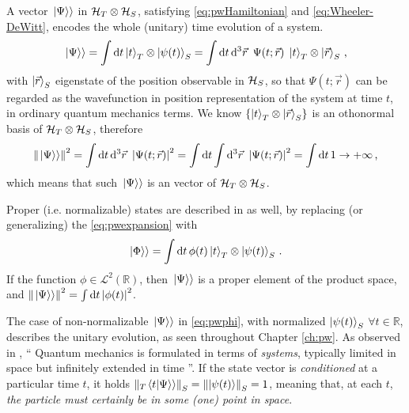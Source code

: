 A vector $\left.\left| \Psi \right\rangle\right\rangle$ in $\mathcal{H}_T \otimes \mathcal{H}_S$,
satisfying \eqref{eq:pwHamiltonian} and \eqref{eq:Wheeler-DeWitt},
encodes the whole (unitary) time evolution of a system.
\begin{equation}\label{eq:pwexpansion}
  \left.\left| \Psi \right\rangle\right\rangle =
    \int \dd{t} \ket{t}_T \otimes \ket{\psi(t)}_S =
    \int \dd{t}\dd[3]{\vec{r}} \ \Psi(t; \vec{r}) \; \ket{t}_T \otimes \ket{\vec{r}}_S
    \,  \text{,}
\end{equation}
with $\ket{\vec{r}}_S$ eigenstate of the position observable in $\mathcal{H}_S$,
so that $\Psi(t; \vec{r})$ can be regarded as the wavefunction in position representation of the system at time $t$,
in ordinary quantum mechanics terms.
We know $\left\{\ket{t}_T \otimes \ket{\vec{r}}_S\right\}$ is an othonormal basis of $\mathcal{H}_T \otimes \mathcal{H}_S$, therefore
\begin{equation}
  \norm{\left.\left| \Psi \right\rangle\right\rangle}^2 =
    \int \dd{t}\dd[3]{\vec{r}} \ \abs{\Psi(t; \vec{r})}^2 =
    \int \dd{t} \int \dd[3]{\vec{r}} \ \abs{\Psi(t; \vec{r})}^2 =
    \int \dd{t} 1 \rightarrow +\infty
    \,  \text{,}
\end{equation}
which means that such $\left.\left| \Psi \right\rangle\right\rangle$ is an  vector of $\mathcal{H}_T \otimes \mathcal{H}_S$.

Proper (i.e. normalizable) states are described in \citereset\cite{Lloyd:Time} as well, by replacing (or generalizing)
the \eqref{eq:pwexpansion} with
\begin{equation}\label{eq:pwphi}
  \left.\left| \Phi \right\rangle\right\rangle =
    \int \dd{t} \phi(t) \ket{t}_T \otimes \ket{\psi(t)}_S \, \text{.}
\end{equation}
If the function $\phi \in \mathscr{L}^2(\mathbb{R})$,
then $\left.\left| \Psi \right\rangle\right\rangle$ is a proper element of the product space,
and $\norm{\left.\left| \Psi \right\rangle\right\rangle}^2 = \int \dd{t} \abs{\phi(t)}^2$.

The case of non-normalizable $\left.\left| \Psi \right\rangle\right\rangle$ in \eqref{eq:pwphi},
with normalized $\ket{\psi(t)}_S$ $\forall t \in \mathbb{R}$,
describes the unitary evolution, as seen throughout Chapter \ref{ch:pw}.
As observed in \cite{Maccone:QGR},
``%
  Quantum mechanics is formulated in terms of \emph{systems},
  typically limited in space but infinitely extended in time%
''.
If the state vector is \emph{conditioned} at a particular time $t$,
it holds $\norm{_{T}\!\left.\left\langle t \middle| \Psi \right\rangle\right\rangle}_S = \norm{\ket{\psi(t)}}_S = 1$,
meaning that, at each $t$,
\emph{the particle must certainly be in some (one) point in space}.

